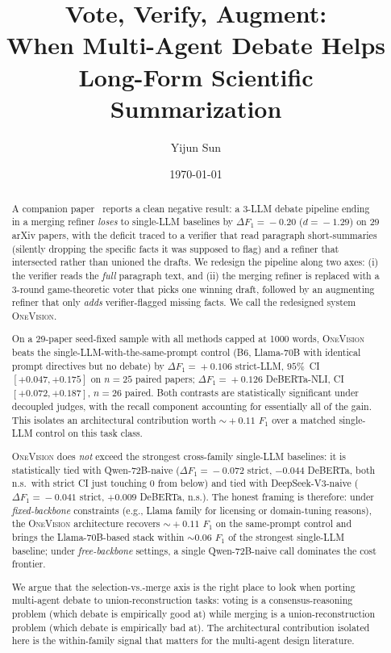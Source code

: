 \documentclass[11pt,a4paper]{article}
\title{Vote, Verify, Augment:\\
When Multi-Agent Debate Helps Long-Form Scientific Summarization}
\author[1]{Yijun Sun}
\affil[1]{University of California, Irvine}
\date{\today}
\begin{document}
\maketitle

\begin{abstract}
A companion paper~\cite{sun2026refined} reports a clean negative
result: a 3-LLM debate pipeline ending in a merging refiner
\emph{loses} to single-LLM baselines by $\Delta F_1 \!=\! -0.20$
($d \!=\! -1.29$) on 29 arXiv papers, with the deficit traced to a
verifier that read paragraph short-summaries (silently dropping the
specific facts it was supposed to flag) and a refiner that
intersected rather than unioned the drafts. We redesign the pipeline
along two axes: (i) the verifier reads the \emph{full} paragraph text,
and (ii) the merging refiner is replaced with a 3-round
game-theoretic voter that picks one winning draft, followed by an
augmenting refiner that only \emph{adds} verifier-flagged missing
facts. We call the redesigned system \textsc{OneVision}.

On a 29-paper seed-fixed sample with all methods capped at 1000 words,
\textsc{OneVision} beats the single-LLM-with-the-same-prompt control
(B6, Llama-70B with identical prompt directives but no debate) by
$\Delta F_1 \!=\! +0.106$ strict-LLM, $95\%$~CI $[+0.047, +0.175]$
on $n\!=\!25$ paired papers; $\Delta F_1 \!=\! +0.126$ DeBERTa-NLI,
CI~$[+0.072, +0.187]$, $n\!=\!26$ paired. Both contrasts are
statistically significant under decoupled judges, with the recall
component accounting for essentially all of the gain. This isolates
an architectural contribution worth $\sim\!+0.11$ $F_1$ over a
matched single-LLM control on this task class.

\textsc{OneVision} does \emph{not} exceed the strongest cross-family
single-LLM baselines: it is statistically tied with Qwen-72B-naive
($\Delta F_1 \!=\! -0.072$ strict, $-0.044$ DeBERTa, both n.s.\
with strict CI just touching $0$ from below) and tied with
DeepSeek-V3-naive ($\Delta F_1 \!=\! -0.041$ strict, $+0.009$
DeBERTa, n.s.). The honest framing is therefore: under
\emph{fixed-backbone} constraints (e.g., Llama family for licensing
or domain-tuning reasons), the \textsc{OneVision} architecture
recovers $\sim\!+0.11$ $F_1$ on the same-prompt control and brings
the Llama-70B-based stack within $\sim\!0.06$ $F_1$ of the strongest
single-LLM baseline; under \emph{free-backbone} settings, a single
Qwen-72B-naive call dominates the cost frontier.

We argue that the selection-vs.-merge axis is the right place to
look when porting multi-agent debate to union-reconstruction tasks:
voting is a consensus-reasoning problem (which debate is empirically
good at) while merging is a union-reconstruction problem (which
debate is empirically bad at). The architectural contribution
isolated here is the within-family signal that matters for the
multi-agent design literature.
\end{abstract}
\end{document}
